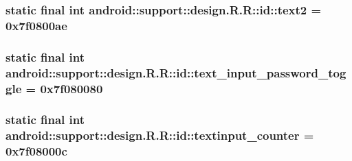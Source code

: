 \hypertarget{classandroid_1_1support_1_1design_1_1_r_1_1id_e653d7d2fc81316055c2ced2092efc18}{
\subsubsection[{text2}]{\setlength{\rightskip}{0pt plus 5cm}static final int android::support::design.R.R::id::text2 = 0x7f0800ae}}
\label{classandroid_1_1support_1_1design_1_1_r_1_1id_e653d7d2fc81316055c2ced2092efc18}


\hypertarget{classandroid_1_1support_1_1design_1_1_r_1_1id_fc1b99dd6b2846be98b593bf04b9926a}{
\subsubsection[{text\_\-input\_\-password\_\-toggle}]{\setlength{\rightskip}{0pt plus 5cm}static final int android::support::design.R.R::id::text\_\-input\_\-password\_\-toggle = 0x7f080080}}
\label{classandroid_1_1support_1_1design_1_1_r_1_1id_fc1b99dd6b2846be98b593bf04b9926a}


\hypertarget{classandroid_1_1support_1_1design_1_1_r_1_1id_29e0db5be967528bac42a9228ed3d610}{
\subsubsection[{textinput\_\-counter}]{\setlength{\rightskip}{0pt plus 5cm}static final int android::support::design.R.R::id::textinput\_\-counter = 0x7f08000c}}
\label{classandroid_1_1support_1_1design_1_1_r_1_1id_29e0db5be967528bac42a9228ed3d610}


